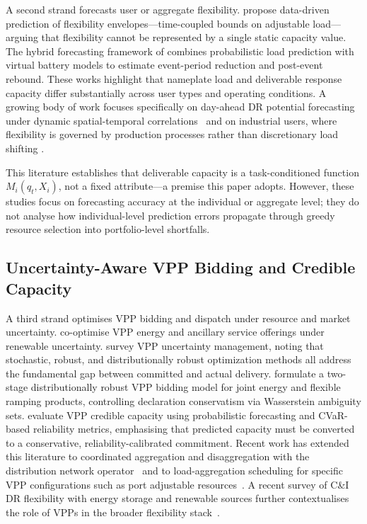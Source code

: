 \documentclass[utf8]{FrontiersinHarvard}
\begin{document}
A second strand forecasts user or aggregate flexibility.
\citep{hekmat2021flexibility} propose data-driven prediction
of flexibility envelopes---time-coupled bounds on adjustable
load---arguing that flexibility cannot be represented by a
single static capacity value.
The hybrid forecasting framework of
\citep{hybrid2025flexforecast} combines probabilistic load
prediction with virtual battery models to estimate event-period
reduction and post-event rebound. These works highlight that
nameplate load and deliverable response capacity differ
substantially across user types and operating conditions.
A growing body of work focuses specifically on day-ahead DR
potential forecasting under dynamic spatial-temporal
correlations~\citep{li2023dayahead} and on industrial users,
where flexibility is governed by production processes rather
than discretionary load shifting
\citep{lu2021industrial,santecchia2022flexibility,sieving2026idrrc}.

This literature establishes that deliverable capacity is a
task-conditioned function $M_i(q_t, X_i)$, not a fixed
attribute---a premise this paper adopts. However, these studies
focus on forecasting accuracy at the individual or aggregate
level; they do not analyse how individual-level prediction
errors propagate through greedy resource selection into
portfolio-level shortfalls.

\subsection{Uncertainty-Aware VPP Bidding and Credible Capacity}
\label{subsec:rw_vpp}

A third strand optimises VPP bidding and dispatch under
resource and market uncertainty.
\citep{naughton2021cooptimizing} co-optimise VPP energy and
ancillary service offerings under renewable uncertainty.
\citep{wang2023vppreview} survey VPP uncertainty management,
noting that stochastic, robust, and distributionally robust
optimization methods all address the fundamental gap between
committed and actual delivery.
\citep{zhang2023distributionally} formulate a two-stage
distributionally robust VPP bidding model for joint energy and
flexible ramping products, controlling declaration conservatism
via Wasserstein ambiguity sets.
\citep{vpp2025credible} evaluate VPP credible capacity using
probabilistic forecasting and CVaR-based reliability metrics,
emphasising that predicted capacity must be converted to a
conservative, reliability-calibrated commitment.
Recent work has extended this literature to coordinated
aggregation and disaggregation with the distribution network
operator~\citep{liu2024vppaggregation} and to load-aggregation
scheduling for specific VPP configurations such as port
adjustable resources~\citep{zhang2025vppscheduling}. A recent
survey of C\&I DR flexibility with energy storage and renewable
sources further contextualises the role of VPPs in the broader
flexibility stack~\citep{yasmin2024survey}.
\end{document}
